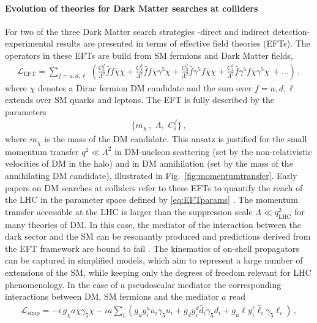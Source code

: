 \documentclass[12pt]{article}
\renewcommand\({\left(}
\renewcommand\){\right)}
\renewcommand\[{\left[}
\renewcommand\]{\right]}
\begin{document}
\paragraph{Evolution of theories for Dark Matter searches at colliders} For two of the three Dark Matter search strategies 
-direct and indirect detection- experimental results are presented in terms of effective field theories (EFTs). The operators in these EFTs are build from SM fermions and Dark Matter fields, 
\begin{align}\label{eq:EFT}
\mathcal{L}_\text{EFT}= \sum_{f=u, d, \ell} \,\left(\frac{C_{1}^f}{\Lambda^2} \bar f f \bar \chi \chi+ \frac{C^f_{2}}{\Lambda^2}\bar  f f \bar \chi \gamma^5\chi +\frac{C_{3}^f }{\Lambda^2}\bar  f \gamma^5 f \bar \chi \chi +\frac{C_{4}^f}{\Lambda^2} \bar  f \gamma^5 f \bar \chi\gamma^5 \chi \,+\ldots \right) \,,
\end{align}
where $\chi$ denotes a Dirac fermion DM candidate and the sum over $f=u,d,\ell$ extends over SM quarks and leptons. 
The EFT is fully described by the parameters 
\begin{align}\label{eq:EFTparams}
\big\{ m_\chi\,,\,\,\Lambda ,\,\, C_i^f\big\} \,,
\end{align}
where $m_\chi$ is the mass of the DM candidate.
This ansatz is justified for the small momentum transfer $q^2\ll \Lambda^2$ in DM-nucleon scattering (set by the non-relativistic velocities of DM in the halo) and in DM annihilation (set by the mass of the annihilating DM candidate), illustrated in Fig.~\ref{fig:momentumtransfer}. Early papers on DM searches at colliders refer to these EFTs to quantify 
the reach of the LHC in the parameter space defined by \eqref{eq:EFTparams}  \cite{Beltran:2010ww, Fox:2011pm,Goodman:2010ku}. The momentum transfer accessible at the LHC is larger than the suppression scale 
$\Lambda \ll q^2_\text{LHC}$ for many theories of DM. 
In this case, the mediator of the interaction between the dark sector and the SM can be resonantly produced and 
predictions derived from the EFT framework are bound to fail \cite{}. The kinematics   
of on-shell propagators can be captured in simplified models, which aim to represent a large number of extensions 
of the SM, while keeping only the degrees of freedom relevant for LHC phenomenology. In the case of a pseudoscalar mediator the corresponding interactions between DM, SM fermions and the mediator $a$ read
\begin{align}\label{eq:simp}
\mathcal{L}_\text{simp}=-i\,g_\chi a\bar \chi \gamma_5 \chi -i a \sum_i \left(g_u y_i^u \bar u_i \gamma_5 u_i + g_d y_i^d \bar d_i \gamma_5 d_i + g_u\ell y_i^\ell \bar \ell_i \gamma_5 \ell_i  \right) \,,
\end{align}
\end{document}
